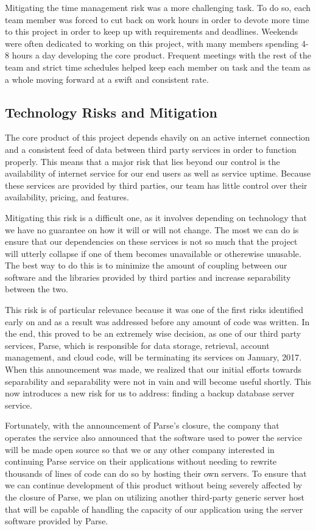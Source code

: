 Mitigating the time management risk was a more challenging task. To do so, each
team member was forced to cut back on work hours in order to devote more time to
this project in order to keep up with requirements and deadlines. Weekends were often dedicated to working on this project, with many members spending 4-8 hours
a day developing the core product. Frequent meetings with the rest of the team
and strict time schedules helped keep each member on task and the team as a
whole moving forward at a swift and consistent rate.


\subsection{Technology Risks and Mitigation}

The core product of this project depends ehavily on an active internet
connection and a consistent feed of data between third party services in order
to function properly. This means that a major risk that lies beyond our control
is the availability of internet service for our end users as well as service
uptime. Because these services are provided by third parties, our team has
little control over their availability, pricing, and features.

Mitigating this risk is a difficult one, as it involves depending on technology
that we have no guarantee on how it will or will not change. The most we can do
is ensure that our dependencies on these services is not so much that the
project will utterly collapse if one of them becomes unavailable or otherewise
unusable. The best way to do this is to minimize the amount of coupling between
our software and the libraries provided by third parties and increase
separability between the two.

This risk is of particular relevance because it was one of the first risks
identified early on and as a result was addressed before any amount of code was
written. In the end, this proved to be an extremely wise decision, as one of our
third party services, Parse, which is responsible for data storage, retrieval,
account management, and cloud code, will be terminating its services on January,
2017. When this announcement was made, we realized that our initial efforts
towards separability and separability were not in vain and will become useful
shortly. This now introduces a new risk for us to address: finding a backup
database server service.

Fortunately, with the announcement of Parse's closure, the company that operates
the service also announced that the software used to power the service will be
made open source so that we or any other company interested in continuing Parse
service on their applications without needing to rewrite thousands of lines of
code can do so by hosting their own servers. To ensure that we can continue
development of this product without being severely affected by the closure of
Parse, we plan on utilizing another third-party generic server host that will
be capable of handling the capacity of our application using the server software
provided by Parse.


